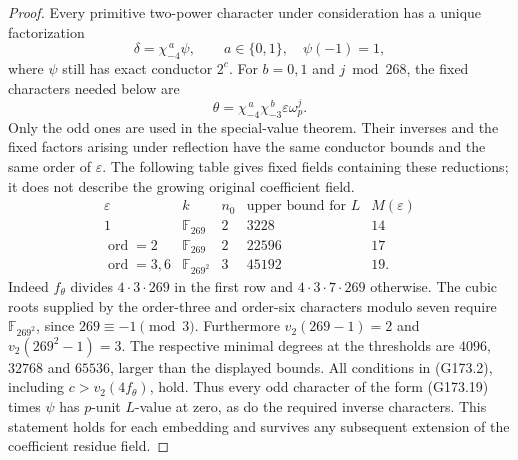 \begin{proof}
Every primitive two-power character under consideration has a unique
factorization
\[
              \delta=\chi_{-4}^{\,a}\psi,
       \qquad a\in\{0,1\},\quad\psi(-1)=1,
 \tag{G173.18}
\]
where $\psi$ still has exact conductor $2^c$.
For $b=0,1$ and $j\bmod268$, the fixed characters needed below are
\[
              \theta=\chi_{-4}^{\,a}\chi_{-3}^{\,b}
                                      \varepsilon\omega_p^j.
 \tag{G173.19}
\]
Only the odd ones are used in the special-value theorem.
Their inverses and the fixed factors arising under reflection have
the same conductor bounds and the same order of $\varepsilon$.
The following table gives fixed fields containing these reductions;
it does not describe the growing original coefficient field.
\[
 \begin{array}{c|c|c|r|c}
 \varepsilon&k&n_0&\text{upper bound for }L&M(\varepsilon)\\ \hline
 1&\mathbb F_{269}&2&3228&14\\
 \operatorname{ord}=2&\mathbb F_{269}&2&22596&17\\
 \operatorname{ord}=3,6&\mathbb F_{269^2}&3&45192&19.
 \end{array}
 \tag{G173.20}
\]
Indeed $f_\theta$ divides $4\cdot3\cdot269$ in the first row and
$4\cdot3\cdot7\cdot269$ otherwise.
The cubic roots supplied by the order-three and order-six characters
modulo seven require $\mathbb F_{269^2}$, since $269\equiv-1\pmod3$.
Furthermore $v_2(269-1)=2$ and $v_2(269^2-1)=3$.
The respective minimal degrees at the thresholds are
$4096$, $32768$ and $65536$, larger than the displayed bounds.
All conditions in (G173.2), including $c>v_2(4f_\theta)$, hold.
Thus every odd character of the form (G173.19) times $\psi$ has
$p$-unit $L$-value at zero, as do the required inverse characters.
This statement holds for each embedding and survives any subsequent
extension of the coefficient residue field.


\end{proof}

